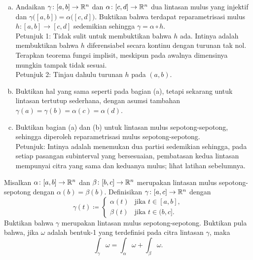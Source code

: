\begin{exercise}
\pagebreak[3]
\leavevmode
\begin{enumerate}[a)]
\item
Andaikan $\gamma \colon [a,b] \to {\mathbb{R}}^n$ dan $\alpha \colon [c,d] \to {\mathbb{R}}^n$
dua lintasan mulus yang injektif dan
$\gamma\bigl([a,b]\bigr) = \alpha\bigl([c,d]\bigr)$.  Buktikan bahwa
terdapat reparametrisasi mulus $h \colon [a,b] \to [c,d]$
sedemikian sehingga $\gamma = \alpha \circ h$.\\
Petunjuk 1: Tidak sulit untuk membuktikan bahwa $h$ ada.
Intinya adalah membuktikan bahwa $h$ diferensiabel secara kontinu
dengan turunan tak nol.  Terapkan teorema fungsi implisit,
meskipun pada awalnya dimensinya mungkin tampak tidak sesuai.\\
Petunjuk 2: Tinjau dahulu turunan $h$ pada $(a,b)$.
\item
Buktikan hal yang sama seperti pada bagian (a), tetapi sekarang untuk lintasan tertutup
sederhana, dengan asumsi tambahan $\gamma(a) = \gamma(b) = \alpha(c) = \alpha(d)$.
\item
Buktikan bagian (a) dan (b) untuk lintasan mulus sepotong-sepotong, sehingga diperoleh
reparametrisasi mulus sepotong-sepotong.\\
Petunjuk: Intinya adalah menemukan dua
partisi sedemikian sehingga, pada setiap pasangan subinterval yang bersesuaian,
pembatasan kedua lintasan mempunyai citra yang sama dan keduanya mulus; lihat
latihan sebelumnya.
\end{enumerate}
\end{exercise}

\begin{exercise} 
\pagebreak[1]
Misalkan $\alpha \colon [a,b] \to {\mathbb{R}}^n$ dan
$\beta \colon [b,c] \to {\mathbb{R}}^n$ merupakan lintasan mulus sepotong-sepotong dengan
$\alpha(b)=\beta(b)$. Definisikan $\gamma \colon [a,c] \to {\mathbb{R}}^n$ dengan
\begin{equation*}
\gamma(t) \coloneqq
\begin{cases}
\alpha(t) & \text{jika } t \in [a,b], \\
\beta(t)  & \text{jika } t \in (b,c].
\end{cases}
\end{equation*}
Buktikan bahwa $\gamma$ merupakan lintasan mulus sepotong-sepotong. Buktikan pula
bahwa, jika $\omega$ adalah bentuk-1 yang terdefinisi pada citra lintasan
$\gamma$, maka
\begin{equation*}
\int_{\gamma} \omega =
\int_{\alpha} \omega +
\int_{\beta} \omega .
\end{equation*}
\end{exercise}


